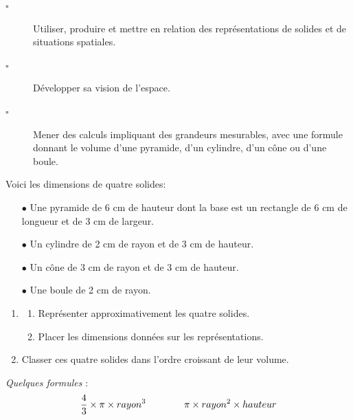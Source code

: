 \documentclass[openany]{book}
\begin{document}
\begin{seance}

\begin{description}
\item[$\square$]  Utiliser, produire et mettre en relation des représentations de solides et de situations
spatiales.
\item[$\square$] Développer sa vision de l’espace.
\item[$\square$] Mener des calculs impliquant des grandeurs mesurables, avec une formule donnant le volume d’une pyramide, d’un cylindre, d’un cône ou d’une boule.
\end{description}
\end{seance}


\Dnb


Voici les dimensions de quatre solides: 

\begin{itemize}
\item[$\bullet$] Une pyramide de 6 cm de hauteur dont la base est un rectangle de 6 cm de longueur et de 3 cm de largeur. 

\item[$\bullet$] Un cylindre de 2 cm de rayon et de 3 cm de hauteur. 


\item[$\bullet$] Un cône de 3 cm de rayon et de 3 cm de hauteur. 

\item[$\bullet$] Une boule de 2 cm de rayon. 
\end{itemize}

\begin{enumerate}
\item

\begin{enumerate}

\item Représenter approximativement les quatre solides. 

\item Placer les dimensions données sur les représentations. 
\end{enumerate}
\item  Classer ces quatre solides dans l'ordre croissant de leur volume. 
\end{enumerate}




\textit{Quelques formules }: 
$$\dfrac{4}{3}\times \pi\times rayon^3\qquad\hfill\qquad \pi\times rayon^2\times hauteur$$
\end{document}
